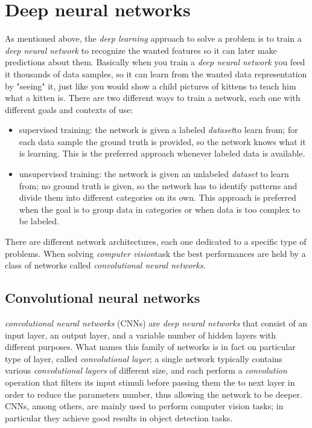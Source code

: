 \section{Deep neural networks}
	As mentioned above, the \emph{deep learning} approach to solve a problem is to train a \emph{deep neural network} to recognize the wanted features so it can later make predictions about them. Basically when you train a \emph{deep neural network} you feed it thousands of data samples, so it can learn from the wanted data representation by "seeing" it, just like you would show a child pictures of kittens to teach him what a kitten is.
	There are two different ways to train a network, each one with different goals and contexts of use:
	\begin{itemize}
		\item supervised training: the network is given a labeled \emph{\gls{dataset}}\glsfirstoccur to learn from; for each data sample the ground truth is provided, so the network knows what it is learning. This is the preferred approach whenever labeled data is available.
		\item unsupervised training: the network is given an unlabeled \emph{dataset} to learn from; no ground truth is given, so the network has to identify patterns and divide them into different categories on its own. This approach is preferred when the goal is to group data in categories or when data is too complex to be labeled.
	\end{itemize}
	There are different network architectures, each one dedicated to a specific type of problems. When solving  \emph{\gls{computer vision}}\glsfirstoccur task the best performances are held by a class of networks called \emph{convolutional neural networks}.
	
	\subsection{Convolutional neural networks}
	\emph{convolutional neural networks} (CNNs) are \emph{deep neural networks} that consist of an input layer, an output layer, and a variable number of hidden layers with different purposes. What names this family of networks is in fact on particular type of layer, called \emph{convolutional layer}; a single network typically contains various \emph{convolutional layers} of different size, and each perform a \emph{convolution} operation that filters its input stimuli before passing them the to next layer in order to reduce the parameters number, thus allowing the network to be deeper. \\
	CNNs, among others, are mainly used to perform computer vision tasks; in particular they achieve good results in object detection tasks.
	
